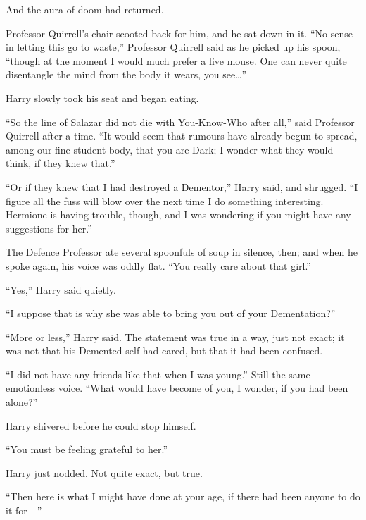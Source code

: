 And the aura of doom had returned.

Professor Quirrell’s chair scooted back for him, and he sat down in it.
“No sense in letting this go to waste,” Professor Quirrell said as he picked up his spoon, “though at the moment I would much prefer a live mouse. One can never quite disentangle the mind from the body it wears, you see…”

Harry slowly took his seat and began eating.

\later

“So the line of Salazar did not die with You-Know-Who after all,” said Professor Quirrell after a time.
“It would seem that rumours have already begun to spread, among our fine student body, that you are Dark; I wonder what they would think, if they knew that.”

“Or if they knew that I had destroyed a Dementor,” Harry said, and shrugged.
“I figure all the fuss will blow over the next time I do something interesting. Hermione is having trouble, though, and I was wondering if you might have any suggestions for her.”

The Defence Professor ate several spoonfuls of soup in silence, then; and when he spoke again, his voice was oddly flat.
“You really care about that girl.”

“Yes,” Harry said quietly.

“I suppose that is why she was able to bring you out of your Dementation?”

“More or less,” Harry said. The statement was true in a way, just not exact; it was not that his Demented self had cared, but that it had been confused.

“I did not have any friends like that when I was young.” Still the same emotionless voice.
“What would have become of you, I wonder, if you had been alone?”

Harry shivered before he could stop himself.

“You must be feeling grateful to her.”

Harry just nodded. Not quite exact, but true.

“Then here is what I might have done at your age, if there had been anyone to do it for—”

